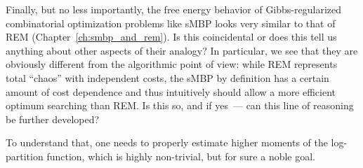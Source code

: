 Finally, but no less importantly, the free energy behavior of Gibbs-regularized
combinatorial optimization problems like sMBP looks very similar to that of REM
(Chapter~\ref{ch:smbp_and_rem}). Is this coincidental or does this tell us
anything about other aspects of their analogy? In particular, we see that they
are obviously different from the algorithmic point of view: while REM represents
total ``chaos'' with independent costs, the sMBP by definition has a certain
amount of cost dependence and thus intuitively should allow a more efficient
optimum searching than REM. Is this so, and if yes~--- can this line of
reasoning be further developed?

To understand that, one needs to properly estimate higher moments of the
log-partition function, which is highly non-trivial, but for sure a noble goal.

